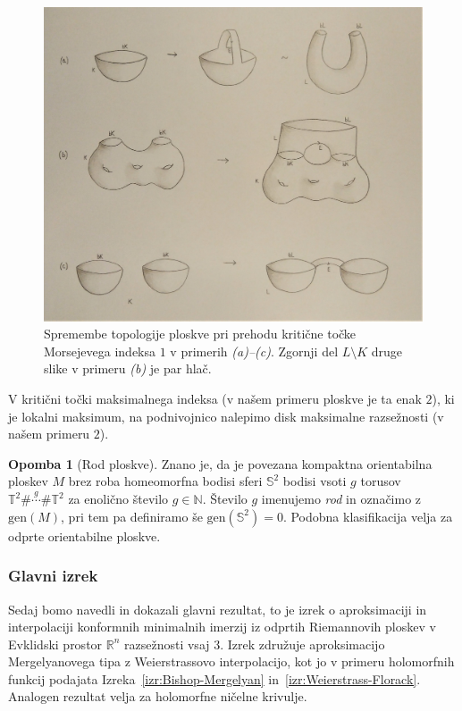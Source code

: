 \documentclass[12pt,a4paper,twoside]{article}
\theoremstyle{definition} %
\newtheorem{opomba}[definicija]{Opomba}
\theoremstyle{plain} %
\numberwithin{equation}{section}  %
\begin{document}
\begin{figure}[h!]
\begin{center}
\includegraphics[scale=0.12]{images/morse.jpg}
\caption{Spremembe topologije ploskve pri prehodu kritične točke Morsejevega indeksa $1$ v primerih \textit{(a)--(c)}. Zgornji del $L \setminus K$ druge slike v primeru \textit{(b)} je par hlač.}
\end{center}
\end{figure}

V kritični točki maksimalnega indeksa (v našem primeru ploskve je ta enak $2$), ki je lokalni maksimum, na podnivojnico nalepimo disk maksimalne razsežnosti (v našem primeru $2$).

\begin{opomba} [Rod ploskve]
Znano je, da je povezana kompaktna orientabilna ploskev $M$ brez roba homeomorfna bodisi sferi $\mathbb{S}^{2}$ bodisi vsoti $g$ torusov 
$\mathbb{T}^{2} \# \stackrel{g}{\cdots} \# \mathbb{T}^{2}$ za enolično število $g \in \mathbb{N}$.
Število $g$ imenujemo \emph{rod} in označimo z $\text{gen}(M)$, pri tem pa definiramo še $\text{gen}(\mathbb{S}^{2}) = 0$.
Podobna klasifikacija velja za odprte orientabilne ploskve.
\end{opomba}

\subsubsection{Glavni izrek}
%
Sedaj bomo navedli in dokazali glavni rezultat, to je izrek o aproksimaciji in interpolaciji konformnih minimalnih imerzij iz odprtih Riemannovih ploskev v Evklidski prostor $\mathbb{R}^{n}$ razsežnosti vsaj $3$. Izrek združuje aproksimacijo Mergelyanovega tipa z Weierstrassovo interpolacijo, kot jo v primeru holomorfnih funkcij podajata Izreka~\ref{izr:Bishop-Mergelyan} in~\ref{izr:Weierstrass-Florack}.
Analogen rezultat velja za holomorfne ničelne krivulje.
\end{document}
